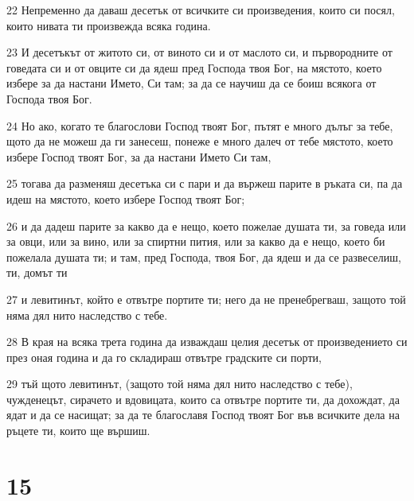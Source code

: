 \par 22 Непременно да даваш десетък от всичките си произведения, които си посял, които нивата ти произвежда всяка година.
\par 23 И десетъкът от житото си, от виното си и от маслото си, и първородните от говедата си и от овците си да ядеш пред Господа твоя Бог, на мястото, което избере за да настани Името, Си там; за да се научиш да се боиш всякога от Господа твоя Бог.
\par 24 Но ако, когато те благослови Господ твоят Бог, пътят е много дълъг за тебе, щото да не можеш да ги занесеш, понеже е много далеч от тебе мястото, което избере Господ твоят Бог, за да настани Името Си там,
\par 25 тогава да разменяш десетъка си с пари и да вържеш парите в ръката си, па да идеш на мястото, което избере Господ твоят Бог;
\par 26 и да дадеш парите за какво да е нещо, което пожелае душата ти, за говеда или за овци, или за вино, или за спиртни пития, или за какво да е нещо, което би пожелала душата ти; и там, пред Господа, твоя Бог, да ядеш и да се развеселиш, ти, домът ти
\par 27 и левитинът, който е отвътре портите ти; него да не пренебрегваш, защото той няма дял нито наследство с тебе.
\par 28 В края на всяка трета година да изваждаш целия десетък от произведението си през оная година и да го складираш отвътре градските си порти,
\par 29 тъй щото левитинът, (защото той няма дял нито наследство с тебе), чужденецът, сирачето и вдовицата, които са отвътре портите ти, да дохождат, да ядат и да се насищат; за да те благославя Господ твоят Бог във всичките дела на ръцете ти, които ще вършиш.

\chapter{15}


